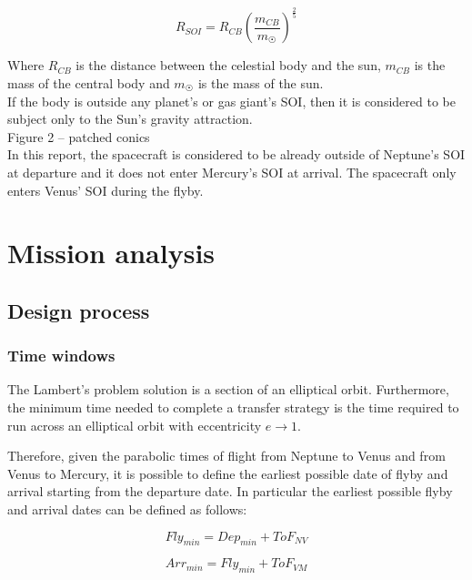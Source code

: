 \documentclass[11pt,a4paper]{report}
\begin{document}
\begin{equation*}
    R_{SOI} = R_{CB}\left(\frac{m_{CB}}{m_{\astrosun}}\right)^{\frac{2}{5}}
\end{equation*}

Where $R_{CB}$ is the distance between the celestial body and the sun, $m_{CB}$ is the mass of the central body and $m_{\astrosun}$ is the mass of the sun.\\ 
If the body is outside any planet’s or gas giant’s SOI, then it is considered to be subject only to the Sun’s gravity attraction.\\
Figure 2 – patched conics\\
In this report, the spacecraft is considered to be already outside of Neptune’s SOI at departure and it does not enter Mercury’s SOI at arrival. The spacecraft only enters Venus’ SOI during the flyby.

\chapter{Mission analysis}

\section{Design process}
\subsection{Time windows}
The Lambert’s problem solution is a section of an elliptical orbit. Furthermore, the minimum time needed to complete a transfer strategy is the time required to run across an elliptical orbit with eccentricity $e\rightarrow1$.

Therefore, given the parabolic times of flight from Neptune to Venus and from Venus to Mercury, it is possible to define the earliest possible date of flyby and arrival starting from the departure date. In particular the earliest possible flyby  and arrival dates can be defined as follows:

\begin{equation*}
    Fly_{min}=Dep_{min}+ ToF_{NV}
\end{equation*}

\begin{equation*}
    Arr_{min}=Fly_{min}+ ToF_{VM}
\end{equation*}
\end{document}
